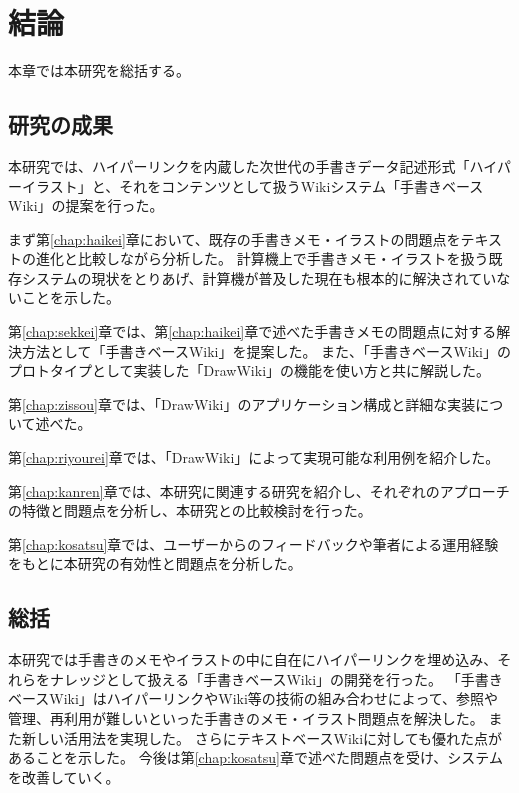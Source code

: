 \chapter{結論}
\label{chap:ketsuron}

本章では本研究を総括する。

\newpage

\section{研究の成果}
本研究では、ハイパーリンクを内蔵した次世代の手書きデータ記述形式「ハイパーイラスト」と、それをコンテンツとして扱うWikiシステム「手書きベースWiki」の提案を行った。

まず第\ref{chap:haikei}章において、既存の手書きメモ・イラストの問題点をテキストの進化と比較しながら分析した。
計算機上で手書きメモ・イラストを扱う既存システムの現状をとりあげ、計算機が普及した現在も根本的に解決されていないことを示した。

第\ref{chap:sekkei}章では、第\ref{chap:haikei}章で述べた手書きメモの問題点に対する解決方法として「手書きベースWiki」を提案した。
また、「手書きベースWiki」のプロトタイプとして実装した「DrawWiki」の機能を使い方と共に解説した。

第\ref{chap:zissou}章では、「DrawWiki」のアプリケーション構成と詳細な実装について述べた。

第\ref{chap:riyourei}章では、「DrawWiki」によって実現可能な利用例を紹介した。

第\ref{chap:kanren}章では、本研究に関連する研究を紹介し、それぞれのアプローチの特徴と問題点を分析し、本研究との比較検討を行った。

第\ref{chap:kosatsu}章では、ユーザーからのフィードバックや筆者による運用経験をもとに本研究の有効性と問題点を分析した。

\section{総括}
本研究では手書きのメモやイラストの中に自在にハイパーリンクを埋め込み、それらをナレッジとして扱える「手書きベースWiki」の開発を行った。
「手書きベースWiki」はハイパーリンクやWiki等の技術の組み合わせによって、参照や管理、再利用が難しいといった手書きのメモ・イラスト問題点を解決した。
また新しい活用法を実現した。
さらにテキストベースWikiに対しても優れた点があることを示した。
今後は第\ref{chap:kosatsu}章で述べた問題点を受け、システムを改善していく。